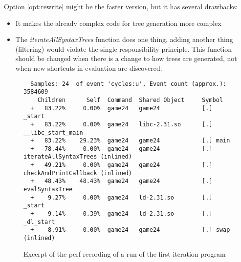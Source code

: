\documentclass[11pt,a4paper]{article}
\begin{document}
Option \ref{opt:rewrite} might be the faster version, but it has
several drawbacks:
\begin{itemize}
\item It makes the already complex code for tree generation more
  complex
\item The \textit{iterateAllSyntaxTrees} function does one thing,
  adding another thing (filtering) would violate the single
  responsibility principle.
  This function should be changed when there is a change to how trees
  are generated, not when new shortcuts in evaluation are discovered.
\end{itemize}

\begin{figure}[h]
  \centering
  \begin{lstlisting}
  Samples: 24  of event 'cycles:u', Event count (approx.): 3584609
    Children      Self  Command  Shared Object     Symbol
  +   83.22%     0.00%  game24   game24            [.] _start
  +   83.22%     0.00%  game24   libc-2.31.so      [.] __libc_start_main
  +   83.22%    29.23%  game24   game24            [.] main
  +   78.44%     0.00%  game24   game24            [.] iterateAllSyntaxTrees (inlined)
  +   49.21%     0.00%  game24   game24            [.] checkAndPrintCallback (inlined)
  +   48.43%    48.43%  game24   game24            [.] evalSyntaxTree
  +    9.27%     0.00%  game24   ld-2.31.so        [.] _start
  +    9.14%     0.39%  game24   ld-2.31.so        [.] _dl_start
  +    8.91%     0.00%  game24   game24            [.] swap (inlined)
  \end{lstlisting}
  \caption[Perf recording for iteration one]{Excerpt of the perf
    recording of a run of the first iteration program}
  \label{fig:perfit1}
\end{figure}
\end{document}
